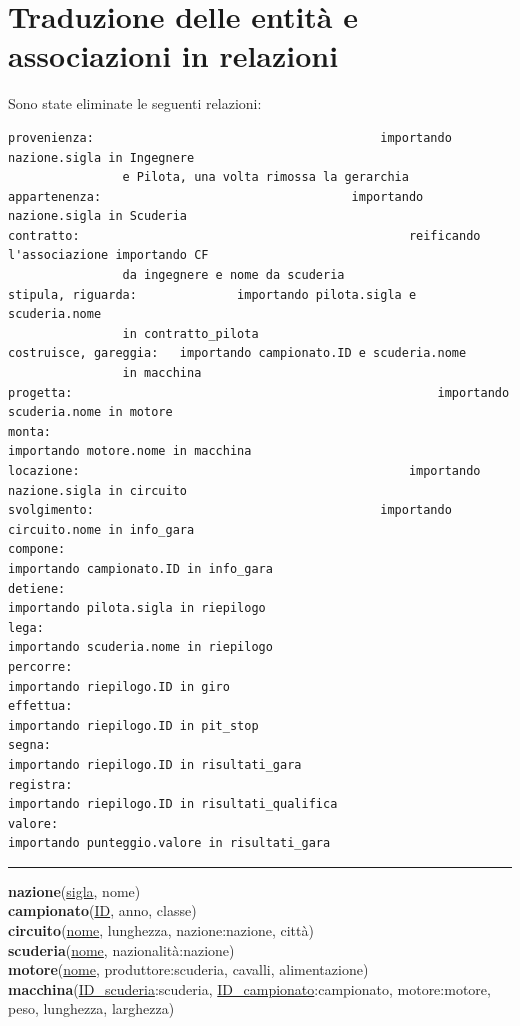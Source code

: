 \documentclass[a4paper,12pt]{report}
\begin{document}
{		\section{Traduzione delle entità e associazioni in relazioni}
			{\fontsize{12.5}{20}\selectfont
			Sono state eliminate le seguenti relazioni:
			\begin{lstlisting}[language={}]
provenienza: 										importando nazione.sigla in Ingegnere 
			  	e Pilota, una volta rimossa la gerarchia
appartenenza: 									importando nazione.sigla in Scuderia
contratto: 												reificando l'associazione importando CF 
			  	da ingegnere e nome da scuderia
stipula, riguarda: 				importando pilota.sigla e scuderia.nome 
			  	in contratto_pilota
costruisce, gareggia: 	importando campionato.ID e scuderia.nome 
			  	in macchina
progetta: 													importando scuderia.nome in motore
monta: 																importando motore.nome in macchina
locazione: 												importando nazione.sigla in circuito
svolgimento: 										importando circuito.nome in info_gara
compone: 														importando campionato.ID in info_gara
detiene: 														importando pilota.sigla in riepilogo
lega:																		importando scuderia.nome in riepilogo
percorre:														importando riepilogo.ID in giro
effettua:														importando riepilogo.ID in pit_stop
segna:																	importando riepilogo.ID in risultati_gara
registra:														importando riepilogo.ID in risultati_qualifica
valore:																importando punteggio.valore in risultati_gara
			\end{lstlisting} \par\noindent\rule{\textwidth}{0.4pt}
			\textbf{nazione}(\underline{sigla}, nome)\\
			\textbf{campionato}(\underline{ID}, anno, classe)\\
			\textbf{circuito}(\underline{nome}, lunghezza, nazione:nazione, città)\\
			\textbf{scuderia}(\underline{nome}, nazionalità:nazione)\\
			\textbf{motore}(\underline{nome}, produttore:scuderia, cavalli, alimentazione)\\
			\textbf{macchina}(\underline{ID\_scuderia}:scuderia, \underline{ID\_campionato}:campionato, 
			\tab\tab motore:motore, peso, lunghezza, larghezza)\\
}}
\end{document}

